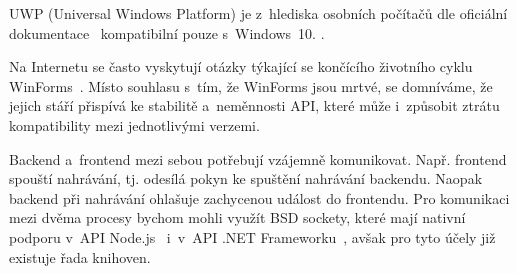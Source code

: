 \documentclass[12pt, a4paper, twoside]{article}
\begin{document}
\begin{enumerate}[leftmargin=*]
{			UWP (Universal Windows Platform) je z~hlediska osobních počítačů dle oficiální dokumentace~\cite{uwpSupportedPlatforms} kompatibilní pouze s~Windows~10.
		}. 
		
		
		Na Internetu se často vyskytují otázky týkající se končícího životního cyklu WinForms~\cite{winformObselote1,winformsObselote2,winformsObselote3, winformsObselote4, winformsObselote5}. Místo souhlasu s~tím, že WinForms jsou mrtvé, se domníváme, že jejich stáří přispívá ke stabilitě a~neměnnosti API, které může i~způsobit ztrátu kompatibility mezi jednotlivými verzemi.
		
	\end{enumerate}
	Backend a~frontend mezi sebou potřebují vzájemně komunikovat. Např. frontend spouští nahrávání, tj. odesílá pokyn ke spuštění nahrávání backendu. Naopak backend při nahrávání ohlašuje zachycenou událost do frontendu. Pro komunikaci mezi dvěma procesy bychom mohli využít BSD sockety, které mají nativní podporu v~API Node.js~\cite{nodejsApi} i~v~API .NET Frameworku~\cite{dotnetApi}, avšak pro tyto účely již existuje řada knihoven. 
	
\end{document}
